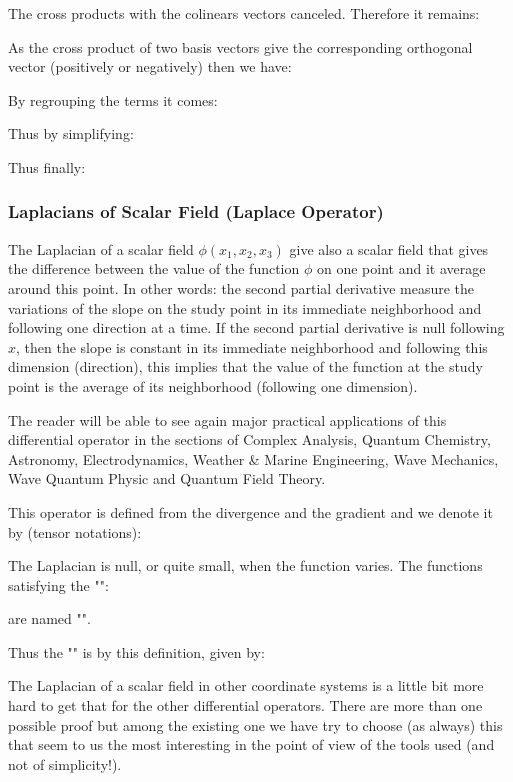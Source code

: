 	The cross products with the colinears vectors canceled. Therefore it remains:
	
	As the cross product of two basis vectors give the corresponding orthogonal vector (positively or negatively) then we have:
	
	By regrouping the terms it comes:
	
	Thus by simplifying:
	
	Thus finally:
	
	
	\pagebreak
	\subsubsection{Laplacians of Scalar Field (Laplace Operator)}
	The Laplacian of a scalar field $\phi(x_1,x_2,x_3)$ give also a scalar field that gives the difference between the value of the function $\phi$ on one point and it average around this point. In other words: the second partial derivative measure the variations of the slope on the study point in its immediate neighborhood and following one direction at a time. If the second partial derivative is null following $x$, then the slope is constant in its immediate neighborhood and following this dimension (direction), this implies that the value of the function at the study point is the average of its neighborhood (following one dimension).
	
	The reader will be able to see again major practical applications of this differential operator in the sections of Complex Analysis, Quantum Chemistry, Astronomy, Electrodynamics, Weather \& Marine Engineering, Wave Mechanics, Wave Quantum Physic and Quantum Field Theory.
	
	This operator is defined from the divergence and the gradient and we denote it by (tensor notations):
	
	The Laplacian is null, or quite small, when the function varies. The functions satisfying the "":
	
	are named "".
	
	Thus the "" is by this definition, given by:
	
	The Laplacian of a scalar field in other coordinate systems is a little bit more hard to get that for the other differential operators. There are more than one possible proof but among the existing one we have try to choose (as always) this that seem to us the most interesting in the point of view of the tools used (and not of simplicity!).

